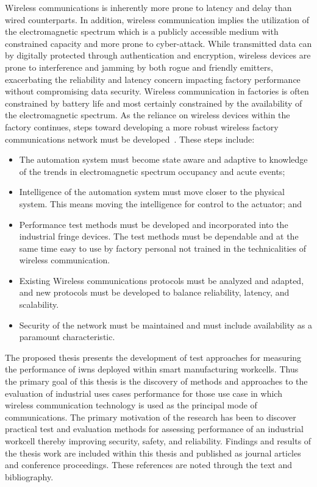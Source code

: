 Wireless communications is inherently more prone to latency and delay than wired counterparts.  In addition, wireless communication implies the utilization of the electromagnetic spectrum which is a publicly accessible medium with constrained capacity and more prone to cyber-attack\cite{Luvisotto2017}.  While transmitted data can by digitally protected through authentication and encryption, wireless devices are prone to interference and jamming by both rogue and friendly emitters, exacerbating the reliability and latency concern impacting factory performance without compromising data security.  Wireless communication in factories is often constrained by battery life and most certainly constrained by the availability of the electromagnetic spectrum.  As the reliance on wireless devices within the factory continues, steps toward developing a more robust wireless factory communications network must be developed~\cite{CandellRW2017}. These steps include:

\begin{itemize}
	\item The automation system must become state aware and adaptive to knowledge of the trends in electromagnetic spectrum occupancy and acute events; 
	\item Intelligence of the automation system must move closer to the physical system.  This means moving the intelligence for control to the actuator; and  
	\item Performance test methods must be developed and incorporated into the industrial fringe devices.  The test methods must be dependable and at the same time easy to use by factory personal not trained in the technicalities of wireless communication. 
	\item Existing Wireless communications protocols must be analyzed and adapted, and new protocols must be developed to balance reliability, latency, and scalability. 
	\item Security of the network must be maintained and must include availability as a paramount characteristic.
\end{itemize}

The proposed thesis presents the development of test approaches for measuring the performance of \glspl{iwn} deployed within smart manufacturing workcells.  Thus the primary goal of this thesis is the discovery of methods and approaches to the evaluation of industrial uses cases performance for those use case in which wireless communication technology is used as the principal mode of communications.  The primary motivation of the research has been to discover practical test and evaluation methods for assessing performance of an industrial workcell thereby improving security, safety, and reliability.   Findings and results of the thesis work are included within this thesis and published as journal articles and conference proceedings.  These references are noted through the text and bibliography.  

